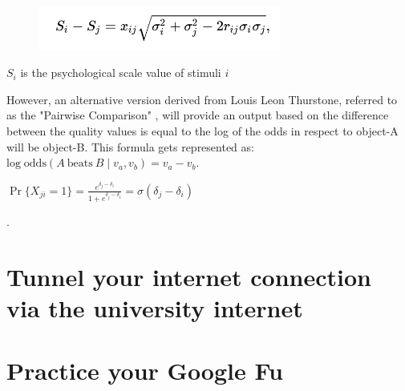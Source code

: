 		\begin{figure}[h]
			\includegraphics[width=8cm]{graphics/LCJ_formula.png}
			\caption{}
			\centering
		\end{figure}
	
		 $S_{i}$ is the psychological scale value of stimuli $i$
		
		However, an alternative version derived from Louis Leon Thurstone, referred to as the "Pairwise Comparison" \cite{thurstone1927law}, will provide an output based on the difference between the quality values is equal to the log of the odds in respect to object-A will be object-B. This formula gets represented as: 
		$\displaystyle \mathrm {log\;odds} (A\ {\text{beats}}\ B\mid v_{a},v_{b})=v_{a}-v_{b} $.
		
		$\Pr\{X_{ji}=1\}={\frac {e^{{\delta _{j}}-{\delta _{i}}}}{1+e^{{\delta _{j}}-{\delta _{i}}}}}=\sigma (\delta _{j}-\delta _{i})$
		
		 .


	\section{Tunnel your internet connection via the university internet}


	\section{Practice your Google Fu}
		\label{sec:google_fu}

